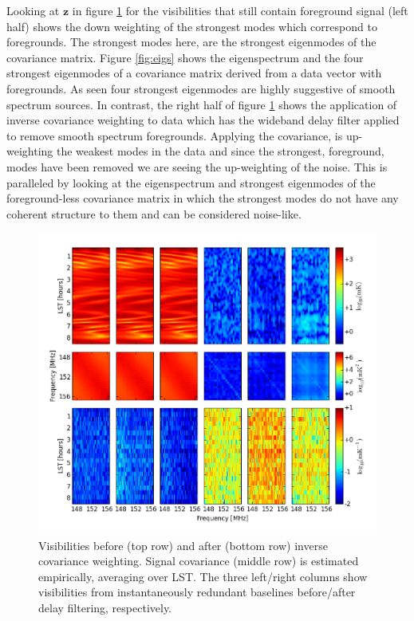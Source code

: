 \documentclass[twocolumn,numberedappendix]{emulateapj} \shorttitle{PSA64}
\begin{document}
Looking at $\mathbf{z}$ in figure \ref{fig:inv_cov} for the visibilities that
still contain foreground signal (left half) shows the down weighting of
the strongest modes which correspond to foregrounds. The strongest modes here,
are the strongest eigenmodes of the covariance matrix. Figure
\ref{fig:eigs} shows the eigenspectrum and the four strongest eigenmodes of a
covariance matrix derived from a data vector with foregrounds. As seen four
strongest eigenmodes are highly suggestive of smooth spectrum sources. In
contrast, the right half of figure \ref{fig:inv_cov} shows the application of
inverse covariance weighting to data which has the wideband delay filter applied
to remove smooth spectrum foregrounds. Applying the covariance, is up-weighting
the weakest modes in the data and since the strongest, foreground, modes have
been removed we are seeing the up-weighting of the noise. This is paralleled by
looking at the eigenspectrum and strongest eigenmodes of the foreground-less
covariance matrix in which the strongest modes do not have any coherent
structure to them and can be considered noise-like.


\begin{figure}\centering
\includegraphics[width=2\columnwidth]{plots/inv_cov.png}
\caption{
Visibilities before (top row) and after (bottom row) inverse covariance weighting.
Signal covariance (middle row) is estimated empirically, averaging over LST.
The three left/right columns show visibilities from
instantaneously redundant baselines before/after delay filtering, respectively.
} \label{fig:inv_cov}
\end{figure}
\end{document}
